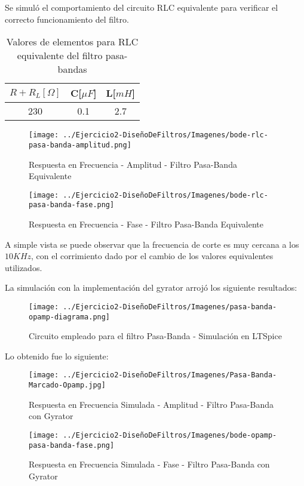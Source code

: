 Se simuló el comportamiento del circuito RLC equivalente para verificar el correcto funcionamiento del filtro.

\begin{table}[H]
    \centering
    \begin{tabular}{|c|c|c|}
    \hline
    \rowcolor[HTML]{C0C0C0} 
    $R+R_L[\Omega]$ & C[$\mu F$] & L[$mH$]  \\ \hline
    230     & 0.1  & 2.7 \\ \hline
    \end{tabular}
    \caption{Valores de elementos para RLC equivalente del filtro pasa-bandas}
    \end{table}


\begin{figure}[H]
    \centering
    \texttt{[image: ../Ejercicio2-DiseñoDeFiltros/Imagenes/bode-rlc-pasa-banda-amplitud.png]}
    \caption{Respuesta en Frecuencia - Amplitud - Filtro Pasa-Banda Equivalente}
\end{figure}

\begin{figure}[H]
    \centering
    \texttt{[image: ../Ejercicio2-DiseñoDeFiltros/Imagenes/bode-rlc-pasa-banda-fase.png]}
    \caption{Respuesta en Frecuencia - Fase - Filtro Pasa-Banda Equivalente}
\end{figure}

A simple vista se puede observar que la frecuencia de corte es muy cercana a los $10 KHz$, con el corrimiento dado por
el cambio de los valores equivalentes utilizados.

La simulación con la implementación del gyrator arrojó los siguiente resultados:

\begin{figure}[H]
    \centering
    \texttt{[image: ../Ejercicio2-DiseñoDeFiltros/Imagenes/pasa-banda-opamp-diagrama.png]}
    \caption{Circuito empleado para el filtro Pasa-Banda - Simulación en LTSpice}
\end{figure}

Lo obtenido fue lo siguiente:

\begin{figure}[H]
    \centering
    \texttt{[image: ../Ejercicio2-DiseñoDeFiltros/Imagenes/Pasa-Banda-Marcado-Opamp.jpg]}
    \caption{Respuesta en Frecuencia Simulada - Amplitud - Filtro Pasa-Banda con Gyrator}
\end{figure}

\begin{figure}[H]
    \centering
    \texttt{[image: ../Ejercicio2-DiseñoDeFiltros/Imagenes/bode-opamp-pasa-banda-fase.png]}
    \caption{Respuesta en Frecuencia Simulada - Fase - Filtro Pasa-Banda con Gyrator}
\end{figure}

